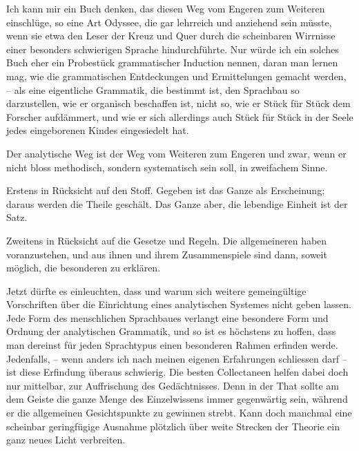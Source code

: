Ich kann mir ein Buch denken, das diesen Weg vom Engeren zum Weiteren einschlüge, so eine Art Odyssee, die gar lehrreich und anziehend sein müsste, wenn sie etwa den Leser der Kreuz und Quer durch die scheinbaren Wirrnisse einer besonders schwierigen Sprache hindurchführte. Nur würde ich ein solches Buch eher ein Probestück grammatischer Induction nennen, daran man lernen mag, wie die grammatischen Entdeckungen und Ermittelungen gemacht werden, – als eine eigentliche Grammatik, die bestimmt ist, den Sprachbau so darzustellen, wie er organisch beschaffen ist, nicht so, wie er Stück für Stück dem Forscher aufdämmert, und wie er sich allerdings auch Stück für Stück in der Seele jedes eingeborenen Kindes eingesiedelt hat.

Der analytische Weg ist der Weg vom Weiteren zum Engeren und zwar, wenn er nicht bloss methodisch, sondern systematisch sein soll, in zweifachem Sinne.

Erstens in Rücksicht auf den Stoff. Gegeben ist das Ganze als Erscheinung; daraus werden die Theile geschält. Das Ganze aber, die lebendige Einheit ist der Satz.

\label{fp.92}

\largerpage
Zweitens in Rücksicht auf die Gesetze und Regeln. Die allgemeineren \label{sp.90} haben voranzustehen, und aus ihnen und ihrem Zusammenspiele sind dann, soweit möglich, die besonderen zu erklären.

Jetzt dürfte es einleuchten, dass und warum sich weitere gemeingültige Vorschriften über die Einrichtung eines analytischen Systemes nicht geben lassen. Jede Form des menschlichen Sprachbaues verlangt eine besondere Form und Ordnung der analytischen Grammatik, und so ist es höchstens zu hoffen, dass man dereinst für jeden Sprachtypus einen besonderen Rahmen erfinden werde. Jedenfalls, – wenn anders ich nach meinen eigenen Erfahrungen schliessen darf – ist diese Erfindung überaus schwierig. Die besten Collectaneen helfen dabei doch nur mittelbar, zur Auffrischung des Gedächtnisses. Denn in der That sollte am  dem Geiste die ganze Menge des Einzelwissens immer gegenwärtig sein, während er die allgemeinen Gesichtspunkte zu gewinnen strebt. Kann doch manchmal eine scheinbar geringfügige Ausnahme plötzlich über weite Strecken der Theorie ein ganz neues Licht verbreiten.

\largerpage


